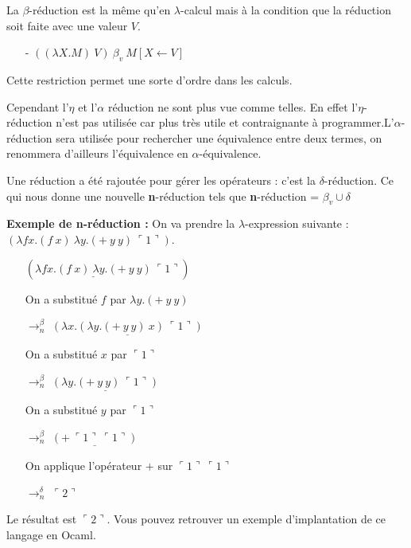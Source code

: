 \documentclass[10pt,a4paper]{report}
\begin{document}
La $\beta$-réduction est la même qu'en $\lambda$-calcul mais à la condition que la réduction soit faite avec une valeur $V$. 
\begin{itemize}
\item[-] $((\lambda X.M)~V)~\beta_{v}~M[X \longleftarrow V]$
\end{itemize} 
\smallbreak
Cette restriction permet une sorte d'ordre dans les calculs.
\medbreak

Cependant l'$\eta$ et l'$\alpha$ réduction ne sont plus vue comme telles. En effet l'$\eta$-réduction n'est pas utilisée car plus très utile et contraignante à programmer.L'$\alpha$-réduction sera utilisée pour rechercher une équivalence entre deux termes, on renommera d'ailleurs l'équivalence en $\alpha$-équivalence.
\medbreak

Une réduction a été rajoutée pour gérer les opérateurs : c'est la $\delta$-réduction. Ce qui nous donne une nouvelle \textbf{n}-réduction tels que \textbf{n}-réduction = $\beta_{v} \cup \delta$
\bigbreak


\textbf{Exemple de \textbf{n}-réduction :} On va prendre la $\lambda$-expression suivante : $(\lambda f x.(f~x)~\lambda y.(+~y~y)~\ulcorner 1\urcorner)$. 
\smallbreak
\begin{itemize}
\item[] $(\underline{\lambda f x.(f~x)~\lambda y.(+~y~y)}~\ulcorner 1\urcorner)$
\item[] On a substitué $f$ par $\lambda y.(+~y~y)$
\item[$\rightarrow^{\beta}_{n}$] $\underline{(\lambda x.(\lambda y.(+~y~y)~x)~\ulcorner 1\urcorner)}$
  
\item[] On a substitué $x$ par $\ulcorner 1\urcorner$
\item[$\rightarrow^{\beta}_{n}$] $\underline{(\lambda y.(+~y~y)~\ulcorner 1\urcorner)}$
  
\item[] On a substitué $y$ par $\ulcorner 1\urcorner$
\item[$\rightarrow^{\beta}_{n}$] $\underline{(+~\ulcorner 1\urcorner~\ulcorner 1\urcorner)}$
  
\item[] On applique l'opérateur $+$ sur $\ulcorner 1\urcorner~\ulcorner 1\urcorner$
\item[$\rightarrow^{\delta}_{n}$] $\ulcorner 2\urcorner$
\end{itemize}
\smallbreak
Le résultat est $\ulcorner 2\urcorner$. Vous pouvez retrouver un exemple d'implantation de ce langage en Ocaml.
\end{document}
